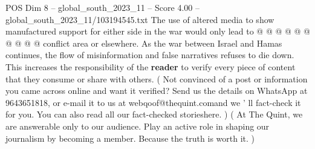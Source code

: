 \begin{textsample}{POS Dim 8 – global\_south\_2023\_11 – Score 4.00 – global\_south\_2023\_11/103194545.txt}
The use of altered media to show manufactured support for either side in the war would only lead to @ @ @ @ @ @ @ @ @ @ conflict area or elsewhere.
As the war between Israel and Hamas continues, the flow of misinformation and false narratives refuses to die down.
This increases the responsibility of the \textbf{reader} to verify every piece of content that they consume or share with others. ( Not convinced of a post or information you came across online and want it verified?
Send us the details on WhatsApp at 9643651818, or e-mail it to us at webqoof@thequint.comand we ' ll fact-check it for you.
You can also read all our fact-checked storieshere. ) ( At The Quint, we are answerable only to our audience.
Play an active role in shaping our journalism by becoming a member.
Because the truth is worth it. )

\end{textsample}
